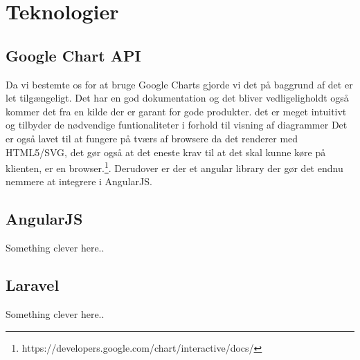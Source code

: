 \section{Teknologier}
\hypertarget{GoogleChartAPI}{}
\subsection{Google Chart API}
Da vi bestemte os for at bruge Google Charts gjorde vi det på baggrund af det er let tilgængeligt.
Det har en god dokumentation og det bliver vedligeligholdt også kommer det fra en kilde der er garant for gode produkter.
det er meget intuitivt og tilbyder de nødvendige funtionaliteter i forhold til visning af diagrammer 
Det er også lavet til at fungere på tværs af browsere da det renderer med HTML5/SVG, 
det gør også at det eneste krav til at det skal kunne køre på klienten, er en browser.\footnote{https://developers.google.com/chart/interactive/docs/}. 
Derudover er der et angular library der gør det endnu nemmere at integrere i AngularJS.
\hypertarget{AngularJS}{}
\subsection{AngularJS}
Something clever here..
\hypertarget{Laravel}{}
\subsection{Laravel}
\label{Laravel}
Something clever here..
